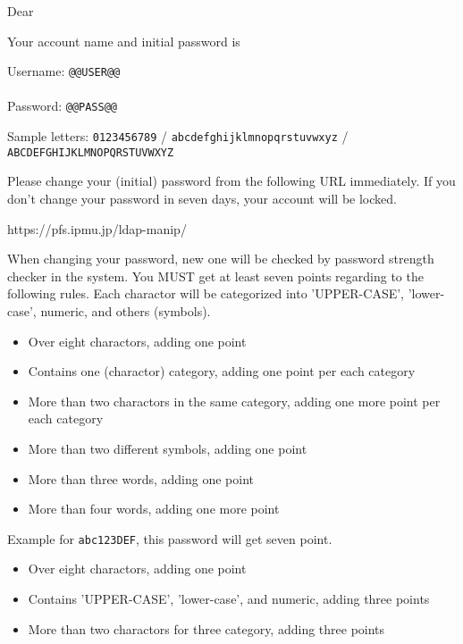 \documentclass[12pt]{jarticle}
\begin{document}
Dear 

Your account name and initial password is

\begin{center}
Username: {\Huge{\tt \verb|@@USER@@|}} \\
 \\
Password: {\Huge{\tt \verb|@@PASS@@|}}
\end{center}

Sample letters: 
{\tt 0123456789} / 
{\tt abcdefghijklmnopqrstuvwxyz} / 
{\tt ABCDEFGHIJKLMNOPQRSTUVWXYZ}

 

Please change your (initial) password from the following URL immediately.
If you don't change your password in seven days, 
your account will be locked.

https://pfs.ipmu.jp/ldap-manip/

 

When changing your password, new one will be checked by password strength 
checker in the system.
You MUST get at least seven points regarding to the following rules.
Each charactor will be categorized into 'UPPER-CASE', 'lower-case', numeric, and 
others (symbols).

\begin{itemize}
  \item Over eight charactors, adding one point
  \item Contains one (charactor) category, adding one point per each category
  \item More than two charactors in the same category, adding one more point per each category
  \item More than two different symbols, adding one point
  \item More than three words, adding one point
  \item More than four words, adding one more point
\end{itemize}

Example for {\tt abc123DEF}, this password will get seven point.

\begin{itemize}
  \item Over eight charactors, adding one point
  \item Contains 'UPPER-CASE', 'lower-case', and numeric, adding three points
  \item More than two charactors for three category, adding three points
\end{itemize}
\end{document}
